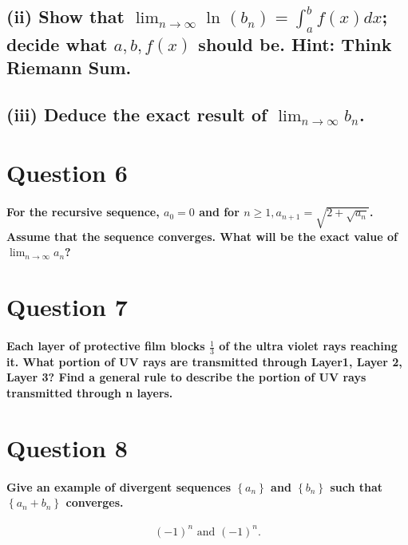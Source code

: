 \subsection*{(ii) Show that $ \lim_{ n \to \infty} \ln^{  } \left( b_n \right) =\int_{ a }^{ b } f\left( x \right) dx$; decide what $ a,b,f\left( x \right)  $ should be. Hint: Think Riemann Sum.}%

\subsection*{(iii) Deduce the exact result of $ \lim_{ n \to \infty} b_n $.}%

\section*{Question 6}%
\paragraph{For the recursive sequence, $ a_0 =0$ and for $ n\ge 1, a_{ n+1 }=\sqrt{ 2+\sqrt{ a_n}} $. Assume that the sequence converges. What will be the exact value of $ \lim_{ n \to \infty} a_{ n } $?}

\section*{Question 7}%
\paragraph{Each layer of protective film blocks $ \frac{ 1 }{ 3 }  $ of the ultra violet rays reaching it. What portion of UV rays are transmitted through Layer1, Layer 2, Layer 3? Find a general rule to describe the portion of UV rays transmitted through n layers.}

\section*{Question 8}%
\paragraph{Give an example of divergent sequences $ \left\{ a_n \right\}  $ and $ \left\{ b_n \right\}  $ such that $ \left\{ a_n + b_n \right\}  $ converges. }
\[
	\left( -1 \right) ^{ n }\text{ and }\left( -1 \right) ^{ n }
.\] 


